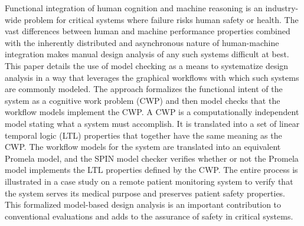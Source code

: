 Functional integration of human cognition and machine reasoning is an industry-wide problem for critical systems where failure risks human safety or health. The vast differences between human and machine performance properties combined with the inherently distributed and asynchronous nature of human-machine integration makes manual design analysis of any such systems difficult at best. This paper details the use of model checking as a means to systematize design analysis in a way that leverages the graphical workflows with which such systems are commonly modeled. The approach formalizes the functional intent of the system as a cognitive work problem (CWP) and then model checks that the workflow models implement the CWP. A CWP is a computationally independent model stating what a system must accomplish. It is translated into a set of linear temporal logic (LTL) properties that together have the same meaning as the CWP. The workflow models for the system are translated into an equivalent Promela model, and the SPIN model checker verifies whether or not the Promela model implements the LTL properties defined by the CWP. The entire process is illustrated in a case study on a remote patient monitoring system to verify that the system serves its medical purpose and preserves patient safety properties.  This formalized model-based design analysis is an important contribution to conventional evaluations and adds to the assurance of safety in critical systems.

\begin{comment}
Remote health-care that integrates human and machine intelligence for patient monitoring is an active area of research. These systems must take extra precautions for safety since the patients are not in the direct supervision of medical providers. This paper details the application of model checking to the Bionous \phware\ remote patient monitoring system to prove it preserves patient safety properties. Patient safety requirements are formalized in a cognitive work problem that is translated to Linear Temporal Logic properties. A cognitive work problem (CWP) is a computationally independent model stating what a system must accomplish. In this example, the system must take action on risk awareness to enhance patient safety, so the CWP defines risk awareness and requisite decisions given the current risk. The \phware\ workflow is translated to Promela to model the asynchronous behaviors of the patient at home, the artificial intelligence in the cloud, and the clinicians. The LTL and Promela models with added behaviors for patient severity are given to the SPIN model checker to prove the system implements the cognitive work problem, meaning it acts appropriately in regards to risk awareness. This result is an important contribution to conventional evaluations and contributes to the assurance of patient safety in remote health IT.
\end{comment}